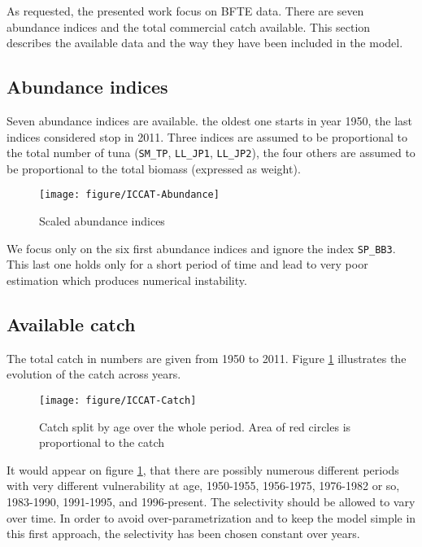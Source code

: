 As requested, the presented  work focus on  BFTE data.  There are
seven abundance indices and the total commercial catch available. 
This section describes the available data and the way they have been included in the model.




\subsection{Abundance indices}

Seven abundance indices are available.   the oldest one starts in year
1950,  the last  indices considered  stop in  2011. Three  indices are
assumed to be proportional to  the total number of tuna (\verb+SM_TP+,
\verb+LL_JP1+,  \verb+LL_JP2+),  the four  others  are  assumed to  be
proportional to the total biomass (expressed as weight).

\begin{center}
  \begin{figure}[tb]
  \texttt{[image: figure/ICCAT-Abundance]} 
  \caption{Scaled abundance indices }
  \end{figure}
\end{center}

We focus only on the six first abundance indices and ignore the index \verb+SP_BB3+. 
This last one holds only for a short period of time and lead to very poor estimation which produces numerical instability. 



\subsection{Available catch}
The  total catch  in  numbers  are given  from  1950  to 2011.  Figure
\ref{fig:TotCatch} illustrates the evolution of the catch across years.
\begin{center}
  \begin{figure}[bt]
  \texttt{[image: figure/ICCAT-Catch]} 
  \caption{  Catch  split by  age over  the whole  period. Area  of red
  circles is proportional to the catch}
  \label{fig:TotCatch}
  \end{figure}
\end{center}
It would appear on figure \ref{fig:TotCatch}, that there are possibly numerous different periods with very different vulnerability at age, 1950-1955, 1956-1975,  1976-1982 or so, 1983-1990, 1991-1995, and 1996-present. The selectivity should be allowed to vary over time. In order to avoid over-parametrization and to keep the model simple in this first approach, the selectivity has been chosen  constant over years.
  
